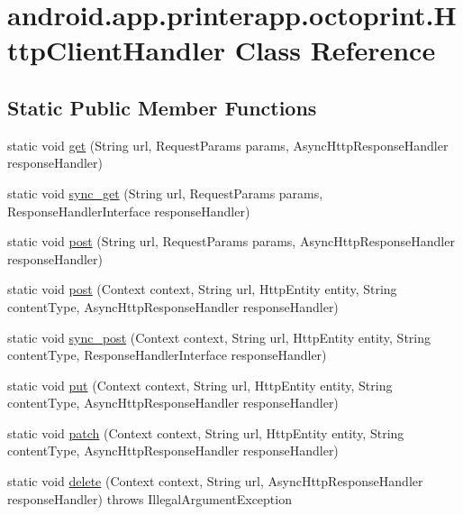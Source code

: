 \hypertarget{classandroid_1_1app_1_1printerapp_1_1octoprint_1_1_http_client_handler}{}\section{android.\+app.\+printerapp.\+octoprint.\+Http\+Client\+Handler Class Reference}
\label{classandroid_1_1app_1_1printerapp_1_1octoprint_1_1_http_client_handler}
\subsection*{Static Public Member Functions}
\begin{DoxyCompactItemize}
\item 
static void \hyperlink{classandroid_1_1app_1_1printerapp_1_1octoprint_1_1_http_client_handler_af97410bd0a611f89d1f1c06cae9ccec8}{get} (String url, Request\+Params params, Async\+Http\+Response\+Handler response\+Handler)
\item 
static void \hyperlink{classandroid_1_1app_1_1printerapp_1_1octoprint_1_1_http_client_handler_ae71595836d86201671cca3d195e145c8}{sync\+\_\+get} (String url, Request\+Params params, Response\+Handler\+Interface response\+Handler)
\item 
static void \hyperlink{classandroid_1_1app_1_1printerapp_1_1octoprint_1_1_http_client_handler_a15e83dabcf79a6045232cb520a0fa58a}{post} (String url, Request\+Params params, Async\+Http\+Response\+Handler response\+Handler)
\item 
static void \hyperlink{classandroid_1_1app_1_1printerapp_1_1octoprint_1_1_http_client_handler_a7c60840a5150b5344423cdd8f5d937d0}{post} (Context context, String url, Http\+Entity entity, String content\+Type, Async\+Http\+Response\+Handler response\+Handler)
\item 
static void \hyperlink{classandroid_1_1app_1_1printerapp_1_1octoprint_1_1_http_client_handler_ac3027fc28fea532cc7daf68dbf87a004}{sync\+\_\+post} (Context context, String url, Http\+Entity entity, String content\+Type, Response\+Handler\+Interface response\+Handler)
\item 
static void \hyperlink{classandroid_1_1app_1_1printerapp_1_1octoprint_1_1_http_client_handler_ac4ef43aca184f484d1afdcba215b8229}{put} (Context context, String url, Http\+Entity entity, String content\+Type, Async\+Http\+Response\+Handler response\+Handler)
\item 
static void \hyperlink{classandroid_1_1app_1_1printerapp_1_1octoprint_1_1_http_client_handler_a33a07b2e39d2059bf4602562737404c0}{patch} (Context context, String url, Http\+Entity entity, String content\+Type, Async\+Http\+Response\+Handler response\+Handler)
\item 
static void \hyperlink{classandroid_1_1app_1_1printerapp_1_1octoprint_1_1_http_client_handler_a155258d3caf0475a4df9a8580c195129}{delete} (Context context, String url, Async\+Http\+Response\+Handler response\+Handler)  throws Illegal\+Argument\+Exception
\end{DoxyCompactItemize}


